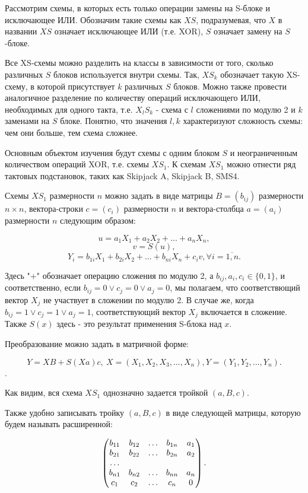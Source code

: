 \documentclass[a4paper,12pt]{report}
\theoremstyle{plain} %
\theoremstyle{definition}
\theoremstyle{remark}
\begin{document}
\begin{large}
Рассмотрим схемы, в которых есть только операции замены на S-блоке и исключающее ИЛИ. Обозначим такие схемы как $XS$, подразумевая, что $X$ в названии $XS$ означает исключающее ИЛИ (т.е. XOR), $S$ означает замену на $S$-блоке. 

Все XS-схемы можно разделить на классы в зависимости от того, сколько различных $S$ блоков используется внутри схемы. Так, $XS_k$ обозначает такую XS-схему, в которой присутствует $k$ различных $S$ блоков. Можно также провести аналогичное разделение по количеству операций исключающего ИЛИ, необходимых для одного такта, т.е. $X_lS_k$ - схема с $l$ сложениями по модулю 2 и $k$ заменами на $S$ блоке. Понятно, что значения $l, k$ характеризуют сложность схемы: чем они больше, тем схема сложнее.

Основным объектом изучения будут схемы с одним блоком $S$ и неограниченным количеством операций XOR, т.е. схемы $XS_1$. К схемам $XS_1$ можно отнести ряд тактовых подстановок, таких как Skipjack A, Skipjack B, SMS4. 

Схемы $XS_1$ размерности $n$ можно задать в виде матрицы $B = (b_{ij})$ размерности $n \times n$, вектора-строки $c = (c_i)$ размерности $n$ и вектора-столбца $a=(a_i)$ размерности $n$ следующим образом:

$$u = a_1X_1 + a_2X_2 + ... + a_nX_n,$$
$$v = S(u),$$
$$Y_i = b_{1i}X_1 + b_{2i}X_2 + ... + b_{ni}X_n + c_iv, \forall i = \overline{1,n}.$$

Здесь "+" обозначает операцию сложения по модулю 2, а $b_{ij}, a_i, c_i \in \{0, 1\}$, и соответственно, если $b_{ij} = 0 \vee c_j=0 \vee a_j = 0$, мы полагаем, что соответствющий вектор $X_j$ не участвует в сложении по модулю 2. В случае же, когда $b_{ij} = 1 \vee c_j=1 \vee a_j = 1$, соответствующий вектор $X_j$ включается в сложение. Также $S(x)$ здесь - это результат применения S-блока над $x$.

Преобразование можно задать в матричной форме:

$$Y = XB + S(Xa)c, ~X = (X_1, X_2, X_3, ..., X_n), Y=(Y_1, Y_2, ..., Y_n).$$.

Как видим, вся схема $XS_1$ однозначно задается тройкой $(a, B, c)$. 

Также удобно записывать тройку $(a, B, c)$ в виде следующей матрицы, которую будем называть расширенной:

$$
\begin{pmatrix}
b_{11} & b_{12} & \ldots & b_{1n} & a_1\\
b_{21} & b_{22} & \ldots & b_{2n} & a_2\\
\dotfill\\
b_{n1} & b_{n2} & \ldots & b_{nn} & a_n\\
c_1    & c_2    & \ldots & c_n    & 0\\
\end{pmatrix}.
$$


\end{large}
\end{document}
